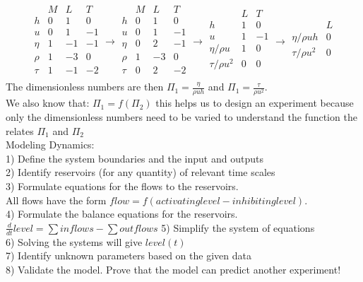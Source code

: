 \documentclass[hyperref]{labbook}
\numberwithin{equation}{experiment}
\numberwithin{table}{experiment}
\numberwithin{figure}{experiment}
\begin{document}
\begin{equation}
\begin{matrix}
          & M & L & T \\
\hline
h       & 0  & 1 & 0 \\
u       & 0  & 1 & -1 \\
\eta & 1 & -1 & -1 \\
\rho & 1  & -3 & 0 \\
\tau & 1  & -1 & -2 \\
\end{matrix} \rightarrow
\begin{matrix}
          & M & L & T \\
\hline
h       & 0  & 1 & 0 \\
u       & 0  & 1 & -1 \\
\eta & 0 &  2 & -1 \\
\rho & 1  & -3 & 0 \\
\tau & 0  & 2 & -2 \\
\end{matrix}
\rightarrow
\begin{matrix}
           & L & T \\
\hline
h         & 1 & 0 \\
u         & 1 & -1 \\
\eta/\rho u &  1 &0 \\
\tau/\rho u^2  &0 & 0 \\
\end{matrix}
\rightarrow
\begin{matrix}
           & L  \\
\hline
\eta/\rho u h&  0 \\
\tau/\rho u^2  &0 \\
\end{matrix}
\end{equation}
The dimensionless numbers are then $\Pi_1 = \frac{\eta}{\rho u h}$ and $\Pi_1 = \frac{\tau}{\rho u^2}$.\\
We also know that: $\Pi_1 = f(\Pi_2 )$ this helps us to design an experiment because only the dimensionless numbers need to be varied to understand the function the relates  $\Pi_1$ and $\Pi_2$ \\[2em]
Modeling Dynamics:\\[0.5em]
1) Define the system boundaries and the input and outputs\\
2) Identify reservoirs (for any quantity) of relevant time scales \\
3) Formulate equations for the flows to the reservoirs. \\All flows have the form $flow = f(activating level - inhibiting level)$. \\
4) Formulate the balance equations for the reservoirs. $\frac{d}{dt}level = \sum inflows - \sum outflows $
5) Simplify the system of equations\\
6) Solving the systems will give $level(t)$\\
7) Identify unknown parameters based on the given data\\
8) {\color{red} Validate the model}. Prove that the model can predict another experiment!\\[1em]
\end{document}
